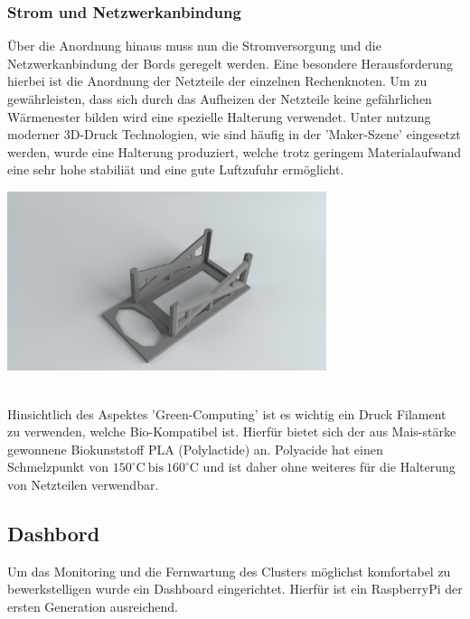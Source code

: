 \subsubsection{Strom und Netzwerkanbindung}
Über die Anordnung hinaus muss nun die Stromversorgung und die Netzwerkanbindung
der Bords geregelt werden. Eine besondere Herausforderung hierbei ist die 
Anordnung der Netzteile der einzelnen Rechenknoten. 
Um zu gewährleisten, dass sich durch das Aufheizen der Netzteile keine gefährlichen
Wärmenester bilden wird eine spezielle Halterung verwendet.
Unter nutzung moderner 3D-Druck Technologien, wie sind häufig in der 'Maker-Szene' eingesetzt werden,
wurde eine Halterung produziert, welche trotz geringem Materialaufwand eine sehr hohe stabiliät 
und eine gute Luftzufuhr ermöglicht.
\begin{minipage}{\textwidth}

\begin{center}
	\includegraphics[width=0.7\textwidth]{./Bilder/Server-Aufbau/RenderPowerSupplyBox30.png}
	\label{fig:sample_figure}

\end{center}	
\end{minipage}
~\\

Hinsichtlich des Aspektes 'Green-Computing' ist es wichtig ein Druck Filament zu verwenden, 
welche Bio-Kompatibel ist. Hierfür bietet sich der aus Mais-stärke gewonnene Biokunststoff PLA
(Polylactide) an. Polyacide hat einen Schmelzpunkt von $150^\circ\text{C}~\text{bis}~160^\circ \text{C}$
und ist daher ohne weiteres für die Halterung von Netzteilen verwendbar.


\subsection{Dashbord}
Um das Monitoring und die Fernwartung des Clusters möglichst komfortabel zu bewerkstelligen wurde ein Dashboard eingerichtet. Hierfür ist ein RaspberryPi der ersten Generation ausreichend.
